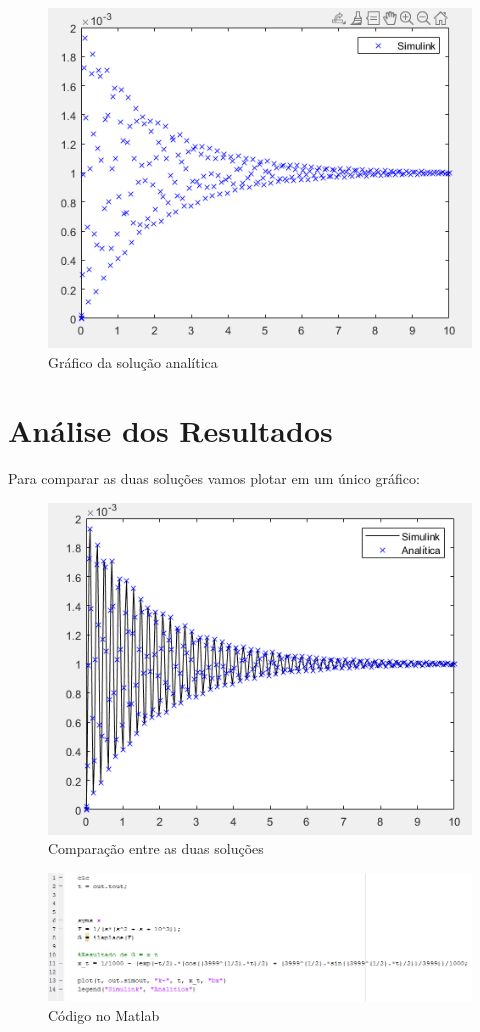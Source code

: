 \documentclass[a4paper, 12pt]{article}
\begin{document}
	\begin{figure}[h]
		\center
		\includegraphics[scale=0.8]{Imagens/a.png}
		\caption{Gráfico da solução analítica}
	\end{figure}	 
	
	\newpage
\section{Análise dos Resultados}
	Para comparar as duas soluções vamos plotar em um único gráfico:
	\begin{figure}[h]
		\center
		\includegraphics[scale=0.6]{Imagens/comp.png}
		\caption{Comparação entre as duas soluções}
	\end{figure}
	\begin{figure}[h]
		\center
		\includegraphics[scale=0.6]{Imagens/matt.png}
		\caption{Código no Matlab}
	\end{figure}
	
	
	
	
	
	
	
	
	
\end{document}
